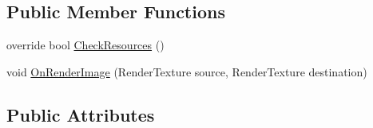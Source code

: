\subsection*{Public Member Functions}
\begin{DoxyCompactItemize}
\item 
override bool \mbox{\hyperlink{class_unity_standard_assets_1_1_image_effects_1_1_bloom_ac5626c3769fbfaa55d651d22801e0017}{Check\+Resources}} ()
\item 
void \mbox{\hyperlink{class_unity_standard_assets_1_1_image_effects_1_1_bloom_a92b38d926c4127bc5486214eaf4b0af4}{On\+Render\+Image}} (Render\+Texture source, Render\+Texture destination)
\end{DoxyCompactItemize}
\subsection*{Public Attributes}
